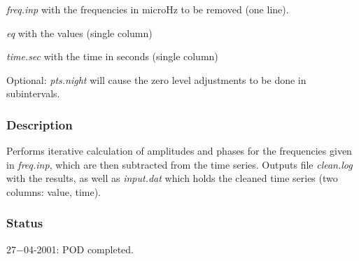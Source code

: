 {\em freq.inp\/} with the frequencies in microHz to be removed (one line).

{\em eq\/} with the values (single column)

{\em time.sec\/} with the time in seconds (single column)

Optional: {\em pts.night\/} will cause the zero level adjustments to be done in subintervals.

\subsubsection*{Description}%

Performs iterative calculation of amplitudes and phases for the frequencies given in 
{\em freq.inp\/}, which are then subtracted from the time series. Outputs file {\em clean.log\/}
with the results, as well as {\em input.dat\/} which holds the cleaned time series (two 
columns: value, time).

\subsubsection*{Status}%

27$-$04-2001: POD completed.

